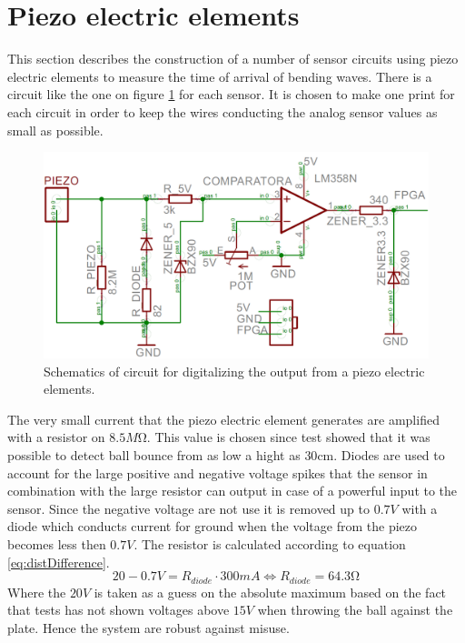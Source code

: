 \section{Piezo electric elements}
\label{piezo}
This section describes the construction of a number of sensor circuits using piezo electric elements to measure the time of arrival of bending waves.
There is a circuit like the one on figure \ref{fig:print} for each sensor. It is chosen to make one print for each circuit in order to keep the wires conducting the analog sensor values as small as possible. 
\begin{figure}[htb]
	\centering
	\includegraphics[width=1.\textwidth]{figures/Print}
	\caption{Schematics of circuit for digitalizing the output from a piezo electric elements.}
	\label{fig:print}
\end{figure}
The very small current that the piezo electric element generates are amplified with a resistor on $8.5M\si{\ohm}$. This value is chosen since test showed that it was possible to detect ball bounce from as low a hight as $30\si{\centi\meter}$.
Diodes are used to account for the large positive and negative voltage spikes that the sensor in combination with the large resistor can output in case of a powerful input to the sensor. 
Since the negative voltage are not use it is removed up to $0.7V$ with a diode which conducts current for ground when the voltage from the piezo becomes less then $0.7V$.
The resistor is calculated according to equation \ref{eq:distDifference}.
\begin{equation}
 20 - 0.7 V = R_{diode} \cdot 300mA \Leftrightarrow R_{diode} = 64.3\si{\ohm}
 \label{diodeResistor}
\end{equation}
Where the $20V$ is taken as a guess on the absolute maximum based on the fact that tests has not shown voltages above $15V$ when throwing the ball against the plate. Hence the system are robust against misuse.
